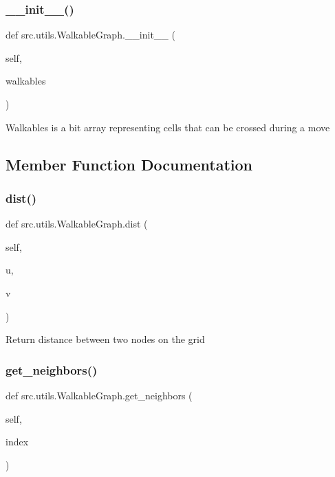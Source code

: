 \subsubsection{\texorpdfstring{\+\_\+\+\_\+init\+\_\+\+\_\+()}{\_\_init\_\_()}}
{\footnotesize\ttfamily def src.\+utils.\+Walkable\+Graph.\+\_\+\+\_\+init\+\_\+\+\_\+ (\begin{DoxyParamCaption}\item[{}]{self,  }\item[{}]{walkables }\end{DoxyParamCaption})}

\begin{DoxyVerb}Walkables is a bit array representing cells that can be crossed
during a move
\end{DoxyVerb}
 

\subsection{Member Function Documentation}
\hypertarget{classsrc_1_1utils_1_1_walkable_graph_a03177c28b206b2d99a67cbe76f1c1f6b}{}\label{classsrc_1_1utils_1_1_walkable_graph_a03177c28b206b2d99a67cbe76f1c1f6b} 
\subsubsection{\texorpdfstring{dist()}{dist()}}
{\footnotesize\ttfamily def src.\+utils.\+Walkable\+Graph.\+dist (\begin{DoxyParamCaption}\item[{}]{self,  }\item[{}]{u,  }\item[{}]{v }\end{DoxyParamCaption})}

\begin{DoxyVerb}Return distance between two nodes on the grid \end{DoxyVerb}
 \hypertarget{classsrc_1_1utils_1_1_walkable_graph_a1654a649f182a6839bae35b08a44a18c}{}\label{classsrc_1_1utils_1_1_walkable_graph_a1654a649f182a6839bae35b08a44a18c} 
\subsubsection{\texorpdfstring{get\+\_\+neighbors()}{get\_neighbors()}}
{\footnotesize\ttfamily def src.\+utils.\+Walkable\+Graph.\+get\+\_\+neighbors (\begin{DoxyParamCaption}\item[{}]{self,  }\item[{}]{index }\end{DoxyParamCaption})}

